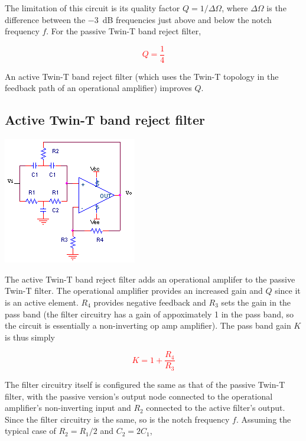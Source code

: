 The limitation of this circuit is its quality factor $Q = 1/\Delta\Omega$, where $\Delta\Omega$ is the difference between the \SI{-3}{\dB} frequencies just above and below the notch frequency $f$.
For the passive Twin-T band reject filter,

\textcolor{red}{
\begin{equation}
Q = \frac{1}{4}
\label{passiveTwinT_Q}
\end{equation}
}

An active Twin-T band reject filter (which uses the Twin-T topology in the feedback path of an operational amplifier) improves $Q$. \autocite[321]{op-amps-for-everyone}

\subsection{Active Twin-T band reject filter}
\begin{center}
	\includegraphics{schematics/activeTwinTbandrejectfilter.PNG}
\end{center}
The active Twin-T band reject filter adds an operational amplifer to the passive Twin-T filter.
The operational amplifier provides an increased gain and $Q$ since it is an active element.
$R_4$ provides negative feedback and $R_3$ sets the gain in the pass band (the filter circuitry has a gain of appoximately 1 in the pass band, so the circuit is essentially a non-inverting op amp amplifier).
The pass band gain $K$ is thus simply

\textcolor{red}{
\begin{equation}
K = 1 + \frac{R_4}{R_3}
\end{equation}
}

The filter circuitry itself is configured the same as that of the passive Twin-T filter, with the passive version's output node connected to the operational amplifier's non-inverting input and $R_2$ connected to the active filter's output.
Since the filter circuitry is the same, so is the notch frequency $f$.
Assuming the typical case of $R_2 = R_1/2$ and $C_2 = 2C_1$,

